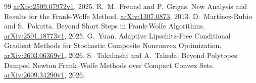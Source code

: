 \begin{thebibliography}{99}
\href{https://arxiv.org/abs/2509.07972v1}{arXiv:2509.07972v1}, 2025.
 R.~M.~Freund and P.~Grigas.
New Analysis and Results for the Frank-Wolfe Method.
\href{https://arxiv.org/abs/1307.0873}{arXiv:1307.0873}, 2013.
 D.~Mart\'inez-Rubio and S.~Pokutta.
Beyond Short Steps in Frank-Wolfe Algorithms.
\href{https://arxiv.org/abs/2501.18773v1}{arXiv:2501.18773v1}, 2025.
 G.~Yuan.
Adaptive Lipschitz-Free Conditional Gradient Methods for Stochastic
Composite Nonconvex Optimization.
\href{https://arxiv.org/abs/2603.06369v1}{arXiv:2603.06369v1}, 2026.
 S.~Takahashi and A.~Takeda.
Beyond Polytopes: Damped Newton Frank--Wolfe Methods over Compact Convex Sets.
\href{https://arxiv.org/abs/2609.34290v1}{arXiv:2609.34290v1}, 2026.
\end{thebibliography}
